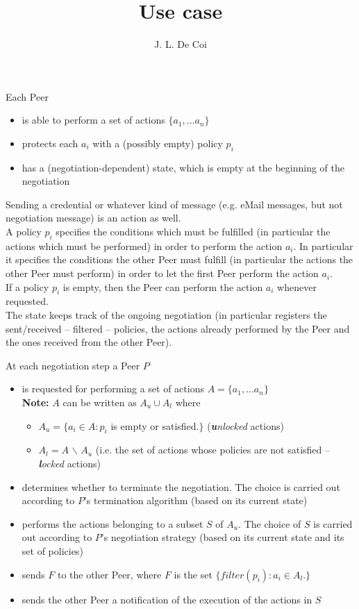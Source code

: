 \documentclass{article}
\begin{document}
\title{Use case}
\author{J. L. De Coi}
\maketitle

Each Peer

\begin{itemize}
	\item is able to perform a set of actions $\{a_{1}, ...a_{n}\}$
	\item protects each $a_{i}$ with a (possibly empty) policy $p_{i}$
	\item has a (negotiation-dependent) state, which is empty at the beginning of the negotiation
\end{itemize}

Sending a credential or whatever kind of message (e.g. eMail messages, but not negotiation message) is an action as well.\\
A policy $p_{i}$ specifies the conditions which must be fulfilled (in particular the actions which must be performed) in order to perform the action $a_{i}$. In particular it specifies the conditions the other Peer must fulfill (in particular the actions the other Peer must perform) in order to let the first Peer perform the action $a_{i}$.\\
If a policy $p_{i}$ is empty, then the Peer can perform the action $a_{i}$ whenever requested.\\
The state keeps track of the ongoing negotiation (in particular registers the sent/received -- filtered -- policies, the actions already performed by the Peer and the ones received from the other Peer).

At each negotiation step a Peer $P$

\begin{itemize}
	\item is requested for performing a set of actions $A = \{a_{1}, ...a_{n}\}$\\
	\textbf{Note:} $A$ can be written as $A_{u} \cup A_{l}$ where
	\begin{itemize}
	  \item $A_{u} = \{a_{i} \in A : p_{i}$ is empty or satisfied.$\}$ (\textit{\textbf{u}nlocked} actions)
	  \item $A_{l} = A$ $\backslash$ $A_{u}$ (i.e. the set of actions whose policies are not satisfied -- \textit{\textbf{l}ocked} actions)
  \end{itemize}
  \item determines whether to terminate the negotiation. The choice is carried out according to $P$'s termination algorithm (based on its current state)
	\item performs the actions belonging to a subset $S$ of $A_{u}$. The choice of $S$ is carried out according to $P$'s negotiation strategy (based on its current state and its set of policies)
	\item sends $F$ to the other Peer, where $F$ is the set $\{filter(p_{i}) : a_{i} \in A_{l}.\}$
	\item sends the other Peer a notification of the execution of the actions in $S$
\end{itemize}
\end{document}

